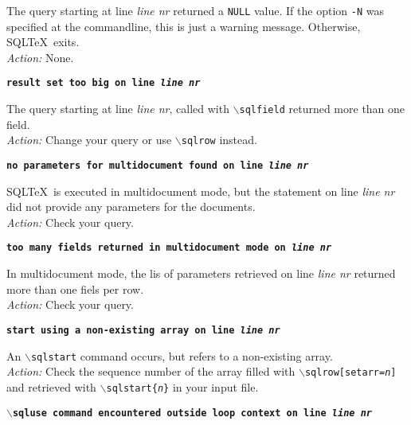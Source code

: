 \documentclass{article}
\newcommand{\bs}{\ensuremath{\backslash}}
\newcommand{\vs}{\vspace{3mm}}
\begin{document}
\noindent The query starting at line \textit{line nr} returned a \texttt{NULL} value. If the
option \texttt{-N} was specified at the commandline, this is just a warning message.
Otherwise, SQL\TeX\ exits. \\
\textit{Action:} None.

\vs

\noindent\textbf{\texttt{result set too big on line \textit{line nr}}}

\vspace{1mm}

\noindent The query starting at line \textit{line nr}, called with \texttt{\bs sqlfield} returned more than one field. \\
\textit{Action:} Change your query or use \texttt{\bs sqlrow} instead.

\vs

\noindent\textbf{\texttt{no parameters for multidocument found on line \textit{line nr}}}

\vspace{1mm}

\noindent SQL\TeX\ is executed in multidocument mode, but the statement on line
\textit{line nr} did not provide any parameters for the documents. \\
\textit{Action:} Check your query.

\vs

\noindent\textbf{\texttt{too many fields returned in multidocument mode on \textit{line nr}}}

\vspace{1mm}

\noindent In multidocument mode, the lis of parameters retrieved on line
\textit{line nr} returned more than one fiels per row. \\
\textit{Action:} Check your query.

\vs

\noindent\textbf{\texttt{start using a non-existing array on line \textit{line nr}}}

\vspace{1mm}

\noindent An \texttt{\bs sqlstart} command occurs, but refers to a non-existing array. \\
\textit{Action:} Check the sequence number of the array filled with \texttt{\bs sqlrow[setarr=\textit{n}]} and retrieved with \texttt{\bs sqlstart\{\textit{n}\}} in your input file.

\vs

\noindent\textbf{\texttt{\bs sqluse command encountered outside loop context on line \textit{line nr}}}
\end{document}
